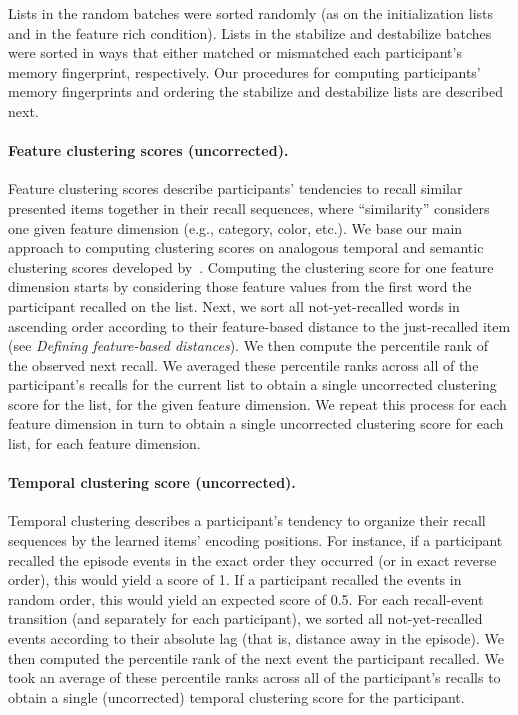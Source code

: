 \documentclass[11pt]{article}
\begin{document}
Lists in the random batches were sorted randomly (as on the initialization
lists and in the feature rich condition). Lists in the stabilize and
destabilize batches were sorted in ways that either matched or mismatched each
participant's memory fingerprint, respectively. Our procedures for computing
participants' memory fingerprints and ordering the stabilize and destabilize
lists are described next.

\paragraph*{Feature clustering scores (uncorrected).}  

Feature clustering scores describe participants' tendencies to recall similar
presented items together in their recall sequences, where ``similarity''
considers one given feature dimension (e.g., category, color, etc.). We base
our main approach to computing clustering scores on analogous temporal and
semantic clustering scores developed by~\citep{PolyEtal09}. Computing the
clustering score for one feature dimension starts by considering those feature
values from the first word the participant recalled on the list. Next, we sort
all not-yet-recalled words in ascending order according to their feature-based
distance to the just-recalled item (see \textit{Defining feature-based
distances}). We then compute the percentile rank of the observed next recall.
We averaged these percentile ranks across all of the participant’s recalls for
the current list to obtain a single uncorrected clustering score for the list,
for the given feature dimension. We repeat this process for each feature
dimension in turn to obtain a single uncorrected clustering score for each
list, for each feature dimension.

\paragraph*{Temporal clustering score (uncorrected).}

Temporal clustering describes a participant's tendency to organize their recall
sequences by the learned items' encoding positions. For instance, if a
participant recalled the episode events in the exact order they occurred (or in
exact reverse order), this would yield a score of 1. If a participant recalled
the events in random order, this would yield an expected score of 0.5. For each
recall-event transition (and separately for each participant), we sorted all
not-yet-recalled events according to their absolute lag (that is, distance away
in the episode). We then computed the percentile rank of the next event the
participant recalled. We took an average of these percentile ranks across all
of the participant’s recalls to obtain a single (uncorrected) temporal
clustering score for the participant.
\end{document}
